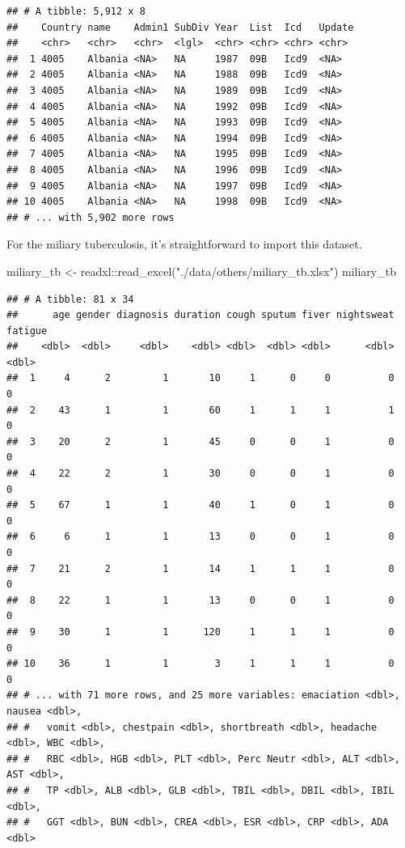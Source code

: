 \documentclass[
]{book}
\newenvironment{Shaded}{\begin{snugshade}}{\end{snugshade}}
\newcommand{\FunctionTok}[1]{\textcolor[rgb]{0.00,0.00,0.00}{#1}}
\newcommand{\NormalTok}[1]{#1}
\newcommand{\OtherTok}[1]{\textcolor[rgb]{0.56,0.35,0.01}{#1}}
\newcommand{\SpecialCharTok}[1]{\textcolor[rgb]{0.00,0.00,0.00}{#1}}
\newcommand{\StringTok}[1]{\textcolor[rgb]{0.31,0.60,0.02}{#1}}
\begin{document}
\begin{verbatim}
## # A tibble: 5,912 x 8
##    Country name    Admin1 SubDiv Year  List  Icd   Update
##    <chr>   <chr>   <chr>  <lgl>  <chr> <chr> <chr> <chr> 
##  1 4005    Albania <NA>   NA     1987  09B   Icd9  <NA>  
##  2 4005    Albania <NA>   NA     1988  09B   Icd9  <NA>  
##  3 4005    Albania <NA>   NA     1989  09B   Icd9  <NA>  
##  4 4005    Albania <NA>   NA     1992  09B   Icd9  <NA>  
##  5 4005    Albania <NA>   NA     1993  09B   Icd9  <NA>  
##  6 4005    Albania <NA>   NA     1994  09B   Icd9  <NA>  
##  7 4005    Albania <NA>   NA     1995  09B   Icd9  <NA>  
##  8 4005    Albania <NA>   NA     1996  09B   Icd9  <NA>  
##  9 4005    Albania <NA>   NA     1997  09B   Icd9  <NA>  
## 10 4005    Albania <NA>   NA     1998  09B   Icd9  <NA>  
## # ... with 5,902 more rows
\end{verbatim}

For the miliary tuberculosis, it's straightforward to import this dataset.

\begin{Shaded}
\begin{Highlighting}[]
\NormalTok{miliary\_tb }\OtherTok{\textless{}{-}}\NormalTok{ readxl}\SpecialCharTok{::}\FunctionTok{read\_excel}\NormalTok{(}\StringTok{"./data/others/miliary\_tb.xlsx"}\NormalTok{)}
\NormalTok{miliary\_tb}
\end{Highlighting}
\end{Shaded}

\begin{verbatim}
## # A tibble: 81 x 34
##      age gender diagnosis duration cough sputum fiver nightsweat fatigue
##    <dbl>  <dbl>     <dbl>    <dbl> <dbl>  <dbl> <dbl>      <dbl>   <dbl>
##  1     4      2         1       10     1      0     0          0       0
##  2    43      1         1       60     1      1     1          1       0
##  3    20      2         1       45     0      0     1          0       0
##  4    22      2         1       30     0      0     1          0       0
##  5    67      1         1       40     1      0     1          0       0
##  6     6      1         1       13     0      0     1          0       0
##  7    21      2         1       14     1      1     1          0       0
##  8    22      1         1       13     0      0     1          0       0
##  9    30      1         1      120     1      1     1          0       0
## 10    36      1         1        3     1      1     1          0       0
## # ... with 71 more rows, and 25 more variables: emaciation <dbl>, nausea <dbl>,
## #   vomit <dbl>, chestpain <dbl>, shortbreath <dbl>, headache <dbl>, WBC <dbl>,
## #   RBC <dbl>, HGB <dbl>, PLT <dbl>, Perc Neutr <dbl>, ALT <dbl>, AST <dbl>,
## #   TP <dbl>, ALB <dbl>, GLB <dbl>, TBIL <dbl>, DBIL <dbl>, IBIL <dbl>,
## #   GGT <dbl>, BUN <dbl>, CREA <dbl>, ESR <dbl>, CRP <dbl>, ADA <dbl>
\end{verbatim}
\end{document}
